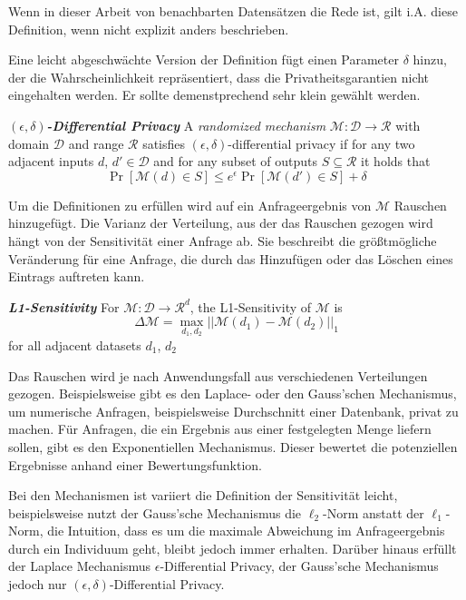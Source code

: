 Wenn in dieser Arbeit von benachbarten Datensätzen die Rede ist, gilt i.A. diese Definition, wenn nicht explizit anders beschrieben.

Eine leicht abgeschwächte Version der Definition fügt einen Parameter $\delta$ hinzu, der die Wahrscheinlichkeit repräsentiert, dass die Privatheitsgarantien nicht eingehalten werden. Er sollte demenstprechend sehr klein gewählt werden.\cite{dwork:2014} 

\begin{definition}\label{def:eps-delta-differential-privacy}
	\emph{\textbf{$(\epsilon, \delta)$-Differential Privacy}} A \textit{randomized mechanism} $\mathcal{M}: \mathcal{D} \rightarrow \mathcal{R}$ with domain $\mathcal{D}$ and range $\mathcal{R}$ satisfies $(\epsilon, \delta)$-differential privacy if for any two adjacent inputs $d$, $d' \in \mathcal{D}$ and for any subset of outputs $S \subseteq \mathcal{R}$ it holds that $$\Pr[\mathcal{M}(d) \in S] \leq e^{\epsilon} \Pr[\mathcal{M}(d') \in S] + \delta$$
\end{definition}

Um die Definitionen zu erfüllen wird auf ein Anfrageergebnis von $\mathcal{M}$ Rauschen hinzugefügt. Die Varianz der Verteilung, aus der das Rauschen gezogen wird hängt von der Sensitivität einer Anfrage ab. Sie beschreibt die größtmögliche Veränderung für eine Anfrage, die durch das Hinzufügen oder das Löschen eines Eintrags auftreten kann.\cite{dwork:2006}

\begin{definition}\label{def:l1-sensitivity}
	\emph{\textbf{L1-Sensitivity}} For $\mathcal{M}: \mathcal{D} \rightarrow \mathcal{R}^{d}$, the L1-Sensitivity of $\mathcal{M}$ is 
	$$
	\Delta \mathcal{M} = \max_{d_1, d_2}{||\mathcal{M}(d_1) - \mathcal{M}(d_2)||}_1
	$$
	for all adjacent datasets $d_1$, $d_2$
\end{definition}

Das Rauschen wird je nach Anwendungsfall aus verschiedenen Verteilungen gezogen. Beispielsweise gibt es den Laplace- oder den Gauss'schen Mechanismus, um numerische Anfragen, beispielsweise Durchschnitt einer Datenbank, privat zu machen. Für Anfragen, die ein Ergebnis aus einer festgelegten Menge liefern sollen, gibt es den Exponentiellen Mechanismus. Dieser bewertet die potenziellen Ergebnisse anhand einer Bewertungsfunktion.\cite{mcsherry:2007}

Bei den Mechanismen ist variiert die Definition der Sensitivität leicht, beispielsweise nutzt der Gauss'sche Mechanismus die $\ell_2$-Norm anstatt der $\ell_1$-Norm, die Intuition, dass es um die maximale Abweichung im Anfrageergebnis durch ein Individuum geht, bleibt jedoch immer erhalten. Darüber hinaus erfüllt der Laplace Mechanismus $\epsilon$-Differential Privacy, der Gauss'sche Mechanismus jedoch nur $(\epsilon, \delta)$-Differential Privacy.\cite[p.261ff]{dwork:2014}

